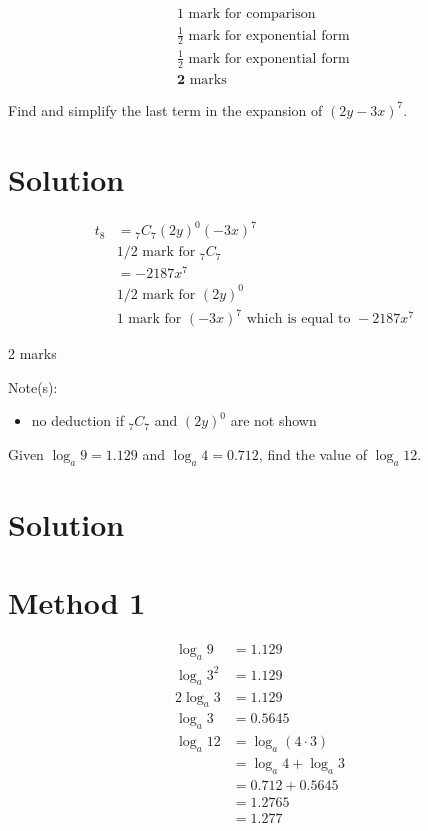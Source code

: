\documentclass[10pt]{article}
\begin{document}
$$
\begin{aligned}
& 1 \text { mark for comparison } \\
& \frac{1}{2} \text { mark for exponential form } \\
& \frac{1}{2} \text { mark for exponential form } \\
& \mathbf{2} \text { marks }
\end{aligned}
$$

Find and simplify the last term in the expansion of $(2 y-3 x)^{7}$.

\section*{Solution}
$$
\begin{array}{rlr}
t_{8} & ={ }_{7} C_{7}(2 y)^{0}(-3 x)^{7} & \\
& 1 / 2 \text { mark for }{ }_{7} C_{7} \\
& =-2187 x^{7} & \\
& 1 / 2 \text { mark for }(2 y)^{0} \\
& 1 \text { mark for }(-3 x)^{7} \text { which is equal to }-2187 x^{7}
\end{array}
$$

2 marks

Note(s):

\begin{itemize}
  \item no deduction if ${ }_{7} C_{7}$ and $(2 y)^{0}$ are not shown
\end{itemize}

Given $\log _{a} 9=1.129$ and $\log _{a} 4=0.712$, find the value of $\log _{a} 12$.

\section*{Solution}
\section*{Method 1}
$$
\begin{aligned}
\log _{a} 9 & =1.129 \\
\log _{a} 3^{2} & =1.129 \\
2 \log _{a} 3 & =1.129 \\
\log _{a} 3 & =0.5645 \\
\log _{a} 12 & =\log _{a}(4 \cdot 3) \\
& =\log _{a} 4+\log _{a} 3 \\
& =0.712+0.5645 \\
& =1.2765 \\
& =1.277
\end{aligned}
$$
\end{document}
